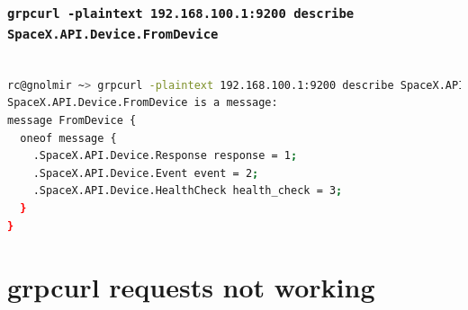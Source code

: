 \documentclass[IN,11pt,twoside,openright,idp,english]{tumthesis}
\begin{document}
\subsubsection{\texttt{grpcurl -plaintext 192.168.100.1:9200 describe SpaceX.API.Device.FromDevice}}
\begin{lstlisting}[language=bash,basicstyle=\tiny]

rc@gnolmir ~> grpcurl -plaintext 192.168.100.1:9200 describe SpaceX.API.Device.FromDevice
SpaceX.API.Device.FromDevice is a message:
message FromDevice {
  oneof message {
    .SpaceX.API.Device.Response response = 1;
    .SpaceX.API.Device.Event event = 2;
    .SpaceX.API.Device.HealthCheck health_check = 3;
  }
}
\end{lstlisting}



\section{grpcurl requests not working}
\end{document}
